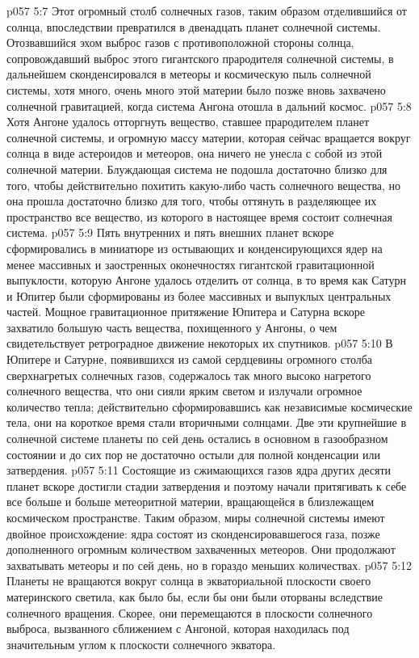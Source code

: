 \vs p057 5:7 Этот огромный столб солнечных газов, таким образом отделившийся от солнца, впоследствии превратился в двенадцать планет солнечной системы. Отозвавшийся эхом выброс газов с противоположной стороны солнца, сопровождавший выброс этого гигантского прародителя солнечной системы, в дальнейшем сконденсировался в метеоры и космическую пыль солнечной системы, хотя много, очень много этой материи было позже вновь захвачено солнечной гравитацией, когда система Ангона отошла в дальний космос.
\vs p057 5:8 Хотя Ангоне удалось отторгнуть вещество, ставшее прародителем планет солнечной системы, и огромную массу материи, которая сейчас вращается вокруг солнца в виде астероидов и метеоров, она ничего не унесла с собой из этой солнечной материи. Блуждающая система не подошла достаточно близко для того, чтобы действительно похитить какую\hyp{}либо часть солнечного вещества, но она прошла достаточно близко для того, чтобы оттянуть в разделяющее их пространство все вещество, из которого в настоящее время состоит солнечная система.
\vs p057 5:9 Пять внутренних и пять внешних планет вскоре сформировались в миниатюре из остывающих и конденсирующихся ядер на менее массивных и заостренных оконечностях гигантской гравитационной выпуклости, которую Ангоне удалось отделить от солнца, в то время как Сатурн и Юпитер были сформированы из более массивных и выпуклых центральных частей. Мощное гравитационное притяжение Юпитера и Сатурна вскоре захватило большую часть вещества, похищенного у Ангоны, о чем свидетельствует ретроградное движение некоторых их спутников.
\vs p057 5:10 В Юпитере и Сатурне, появившихся из самой сердцевины огромного столба сверхнагретых солнечных газов, содержалось так много высоко нагретого солнечного вещества, что они сияли ярким светом и излучали огромное количество тепла; действительно сформировавшись как независимые космические тела, они на короткое время стали вторичными солнцами. Две эти крупнейшие в солнечной системе планеты по сей день остались в основном в газообразном состоянии и до сих пор не достаточно остыли для полной конденсации или затвердения.
\vs p057 5:11 Состоящие из сжимающихся газов ядра других десяти планет вскоре достигли стадии затвердения и поэтому начали притягивать к себе все больше и больше метеоритной материи, вращающейся в близлежащем космическом пространстве. Таким образом, миры солнечной системы имеют двойное происхождение: ядра состоят из сконденсировавшегося газа, позже дополненного огромным количеством захваченных метеоров. Они продолжают захватывать метеоры и по сей день, но в гораздо меньших количествах.
\vs p057 5:12 Планеты не вращаются вокруг солнца в экваториальной плоскости своего материнского светила, как было бы, если бы они были оторваны вследствие солнечного вращения. Скорее, они перемещаются в плоскости солнечного выброса, вызванного сближением с Ангоной, которая находилась под значительным углом к плоскости солнечного экватора.
